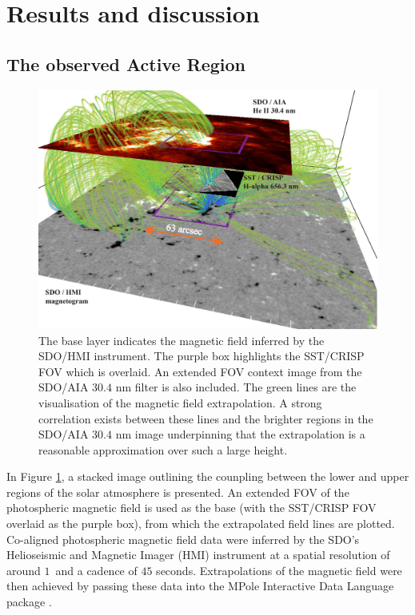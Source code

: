 \section{Results and discussion}
\label{sect2}

\subsection{The observed Active Region}

	\begin{figure}
		\centering
		\includegraphics[width=\textwidth]{full_overview.pdf}
		\caption
		{
		The base layer indicates the magnetic field inferred by the SDO/HMI instrument.
		The purple box highlights the SST/CRISP FOV which is overlaid.
		An extended FOV context image from the SDO/AIA $30.4$ nm filter is also included.
		The green lines are the visualisation of the magnetic field extrapolation.
		A strong correlation exists between these lines and the brighter regions in the SDO/AIA $30.4$ nm image underpinning that the extrapolation is a reasonable approximation over such a large height.
		}
		\label{mag_field}
	\end{figure}

	In Figure \ref{mag_field}, a stacked image outlining the counpling between the lower and upper regions of the solar atmosphere is presented.
	An extended FOV of the photospheric magnetic field is used as the base (with the SST/CRISP FOV overlaid as the purple box), from which the extrapolated field lines are plotted.
	Co-aligned photospheric magnetic field data were inferred by the SDO's Helioseismic and Magnetic Imager (HMI) instrument at a spatial resolution of around $1$\arcsecs\ and a cadence of $45$ seconds.
	Extrapolations of the magnetic field were then achieved by passing these data into the MPole Interactive Data Language package \citep{Longcope1996,Longcope2002}.

